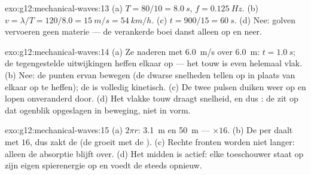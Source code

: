 \begin{solution}{exo:g12:mechanical-waves:13}
(a) $T = 80/10 = \qty{8.0}{s}$, $f = \qty{0.125}{Hz}$.
(b) $v = \lambda/T = 120/8.0 = \qty{15}{m/s} = \qty{54}{km/h}$.
(c) $t = 900/15 = \qty{60}{s}$. (d) Nee: golven vervoeren geen materie
--- de verankerde boei danst alleen op en neer.
\end{solution}

\begin{solution}{exo:g12:mechanical-waves:14}
(a) Ze naderen met \qty{6.0}{m/s} over \qty{6.0}{m}: $t = \qty{1.0}{s}$;
de tegengestelde uitwijkingen heffen elkaar op --- het touw is even
helemaal vlak. (b) Nee: de punten ervan bewegen (de dwarse snelheden
tellen op in plaats van elkaar op te heffen); de  is volledig
kinetisch. (c) De twee pulsen duiken weer op en lopen onveranderd door.
(d) Het vlakke touw draagt snelheid, en dus : de  zit op dat
ogenblik opgeslagen in beweging, niet in vorm.
\end{solution}

\begin{solution}{exo:g12:mechanical-waves:15}
(a) $2\pi r$: \qty{3.1}{m} en \qty{50}{m} --- $\times 16$. (b) De 
per  daalt met $16$, dus zakt de  (de  groeit met de
). (c) Rechte fronten worden niet langer: alleen de absorptie
blijft over. (d) Het midden is actief: elke toeschouwer staat op zijn
eigen spierenergie op en voedt de  steeds opnieuw.
\end{solution}

